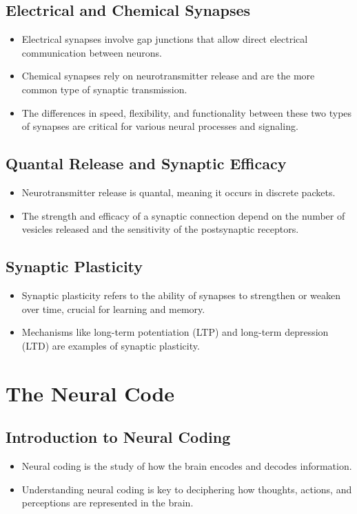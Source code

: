 \documentclass{article}
\begin{document}
\subsection{Electrical and Chemical Synapses}
\begin{itemize}
    \item Electrical synapses involve gap junctions that allow direct electrical communication between neurons.
    \item Chemical synapses rely on neurotransmitter release and are the more common type of synaptic transmission.
    \item The differences in speed, flexibility, and functionality between these two types of synapses are critical for various neural processes and signaling.
\end{itemize}

\subsection{Quantal Release and Synaptic Efficacy}
\begin{itemize}
    \item Neurotransmitter release is quantal, meaning it occurs in discrete packets.
    \item The strength and efficacy of a synaptic connection depend on the number of vesicles released and the sensitivity of the postsynaptic receptors.
\end{itemize}

\subsection{Synaptic Plasticity}
\begin{itemize}
    \item Synaptic plasticity refers to the ability of synapses to strengthen or weaken over time, crucial for learning and memory.
    \item Mechanisms like long-term potentiation (LTP) and long-term depression (LTD) are examples of synaptic plasticity.
\end{itemize}
\section{The Neural Code}

\subsection{Introduction to Neural Coding}
\begin{itemize}
    \item Neural coding is the study of how the brain encodes and decodes information.
    \item Understanding neural coding is key to deciphering how thoughts, actions, and perceptions are represented in the brain.
\end{itemize}
\end{document}
